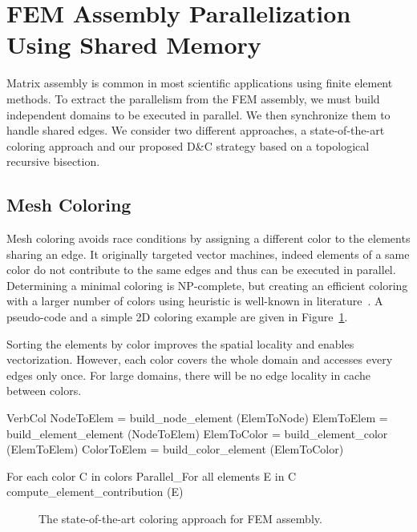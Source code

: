 \documentclass[10pt]{IOS-Book-Article}
\begin{document}
\section{FEM Assembly Parallelization Using Shared Memory}
\label{sec:assembly}
Matrix assembly is common in most scientific applications using finite element methods. 
To extract the parallelism from the FEM assembly, we must build independent domains to be executed in parallel. We then synchronize them to handle shared edges.
We consider two different approaches, a state-of-the-art coloring approach and our proposed D\&C strategy based on a topological recursive bisection.


\subsection{Mesh Coloring}
\label{sec:col}
Mesh coloring avoids race conditions by assigning a different color to the elements sharing an edge.
It originally targeted vector machines, indeed elements of a same color do not contribute to the same edges and thus can be executed in parallel.
Determining a minimal coloring is NP-complete, but creating an efficient coloring with a larger number of colors using heuristic is well-known in literature~\cite{CPUfe}.
A pseudo-code and a simple 2D coloring example are given in Figure~\ref{fig:colApp}.

Sorting the elements by color improves the spatial locality and enables vectorization.
However, each color covers the whole domain and accesses every edges only once.
For large domains, there will be no edge locality in cache between colors.

\begin{SaveVerbatim}[]{VerbCol}
NodeToElem = build_node_element (ElemToNode)
ElemToElem = build_element_element (NodeToElem)
ElemToColor = build_element_color (ElemToElem)
ColorToElem = build_color_element (ElemToColor)

For each color C in colors
  Parallel_For all elements E in C
    compute_element_contribution (E)
\end{SaveVerbatim}

\begin{figure}[htp]
\caption{The state-of-the-art coloring approach for FEM assembly.}
\label{fig:colApp}
\end{figure}
\end{document}
